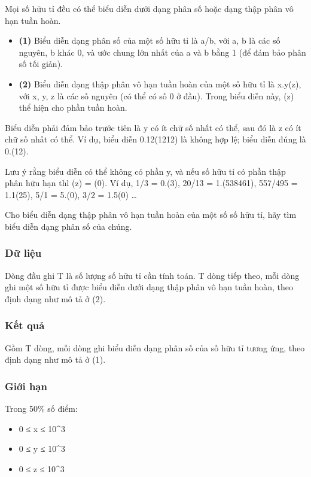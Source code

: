 



   Mọi số hữu tỉ đều có thể biểu diễn dưới dạng phân số hoặc dạng thập phân vô hạn tuần hoàn.  
\begin{itemize}
	\item \textbf{     (1)    }    Biểu diễn dạng phân số của một số hữu tỉ là a/b, với a, b là các số nguyên, b khác 0, và ước chung lớn nhất của a và b bằng 1 (để đảm bảo phân số tối giản).   
	\item \textbf{     (2)    }    Biểu diễn dạng thập phân vô hạn tuần hoàn của một số hữu tỉ là x.y(z), với x, y, z là các số nguyên (có thể có số 0 ở đầu). Trong biểu diễn này, (z) thể hiện cho phần tuần hoàn.   
\end{itemize}

   Biểu diễn phải đảm bảo trước tiên là y có ít chữ số nhất có thể, sau đó là z có ít chữ số nhất có thể. Ví dụ, biểu diễn 0.12(1212) là không hợp lệ; biểu diễn đúng là 0.(12).  

   Lưu ý rằng biểu diễn có thể không có phần y, và nếu số hữu tỉ có phần thập phân hữu hạn thì (z) = (0). Ví dụ, 1/3 = 0.(3), 20/13 = 1.(538461), 557/495 = 1.1(25), 5/1 = 5.(0), 3/2 = 1.5(0) …  

   Cho biểu diễn dạng thập phân vô hạn tuần hoàn của một số số hữu tỉ, hãy tìm biểu diễn dạng phân số của chúng.  

\subsubsection{   Dữ liệu  }

   Dòng đầu ghi T là số lượng số hữu tỉ cần tính toán. T dòng tiếp theo, mỗi dòng ghi một số hữu tỉ được biểu diễn dưới dạng thập phân vô hạn tuần hoàn, theo định dạng như mô tả ở (2).  

\subsubsection{   Kết quả  }

   Gồm T dòng, mỗi dòng ghi biểu diễn dạng phân số của số hữu tỉ tương ứng, theo định dạng như mô tả ở (1).  

\subsubsection{   Giới hạn  }

   Trong 50\% số điểm:  
\begin{itemize}
	\item     0 ≤ x ≤ 10\textasciicircum3   
	\item     0 ≤ y ≤ 10\textasciicircum3   
	\item     0 ≤ z ≤ 10\textasciicircum3   
\end{itemize}

